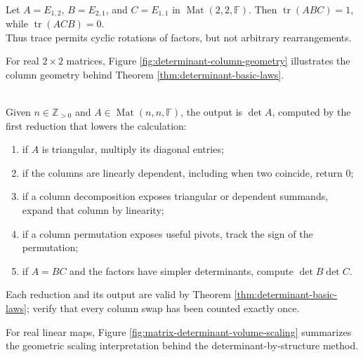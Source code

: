\begin{example} \label{ex:trace-cyclicity-not-arbitrary-permutation} \\
Let $A=E_{1,2}$, $B=E_{2,1}$, and $C=E_{1,1}$ in $\operatorname{Mat}(2,2,\mathbb{F})$. Then $\operatorname{tr}(ABC)=1$, while $\operatorname{tr}(ACB)=0$.\\
Thus trace permits cyclic rotations of factors, but not arbitrary rearrangements.
\end{example}

For real $2\times2$ matrices, Figure \ref{fig:determinant-column-geometry} illustrates the column geometry behind Theorem \ref{thm:determinant-basic-laws}.

\begin{illustrationfigure}[H]
  \centering
  
  \caption{The columns $\mathbf{a}_1,\mathbf{a}_2\in\mathbb{R}^2$ span a parallelogram whose signed area is their determinant.}
  \label{fig:determinant-column-geometry}
\end{illustrationfigure}

\begin{computationmethod} \label{meth:determinant-by-structure} \\
Given $n\in\mathbb{Z}_{>0}$ and $A\in\operatorname{Mat}(n,n,\mathbb{F})$, the output is $\det A$, computed by the first reduction that lowers the calculation:
\begin{enumerate}[label=(\roman*)]
\setlength{\itemsep}{0pt}
\item if $A$ is triangular, multiply its diagonal entries;
\item if the columns are linearly dependent, including when two coincide, return $0$;
\item if a column decomposition exposes triangular or dependent summands, expand that column by linearity;
\item if a column permutation exposes useful pivots, track the sign of the permutation;
\item if $A=BC$ and the factors have simpler determinants, compute $\det B\det C$.
\end{enumerate}
Each reduction and its output are valid by Theorem \ref{thm:determinant-basic-laws}; verify that every column swap has been counted exactly once.
\end{computationmethod}

For real linear maps, Figure \ref{fig:matrix-determinant-volume-scaling} summarizes the geometric scaling interpretation behind the determinant-by-structure method.

